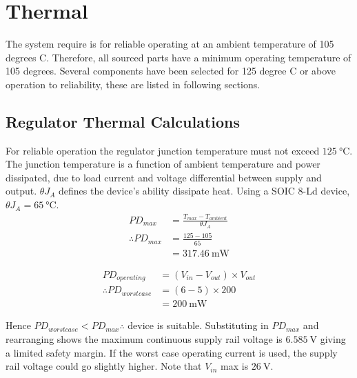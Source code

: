 \section{Thermal}
\label{ap:thermal}
The system require is for reliable operating at an ambient temperature of 105 degrees C.
Therefore, all sourced parts have a minimum operating temperature of 105 degrees.
Several components have been selected for 125 degree C or above operation to reliability, these are listed in following sections.

\subsection{Regulator Thermal Calculations}
\label{ap:regulator}
For reliable operation the regulator junction temperature must not exceed $\SI{125}{\degreeCelsius}$. 
The junction temperature is a function of ambient temperature and power dissipated, due to load current and voltage differential between supply and output.
$\theta J_A$ defines the device's ability dissipate heat.
Using a SOIC 8-Ld device, $\theta J_A = \SI{65}{\degreeCelsius}$.
\begin{align}
	PD_{max} &= \frac{T_{max} - T_{ambient}}{\theta J_A} \\ 
	\therefore PD_{max} &= \frac{125-105}{ 65} \nonumber \\
		&= \SI{317.46}{\milli\watt} \nonumber
\end{align}

\begin{align}
	PD_{operating} &= (V_{in} - V_{out})\times V_{out} \\
	\therefore PD_{worst case} &= (6-5)\times 200 \nonumber \\
		&= \SI{200}{\milli\watt} \nonumber
\end{align}

Hence $PD_{worst case} < PD_{max} \therefore$ device is suitable.
Substituting in $PD_{max}$ and rearranging shows the maximum continuous supply rail voltage is $\SI{6.585}{\volt}$ giving a limited safety margin.
If the worst case operating current is used, the supply rail voltage could go slightly higher.
Note that $V_{in}$ max is $\SI{26}{\volt}$.

